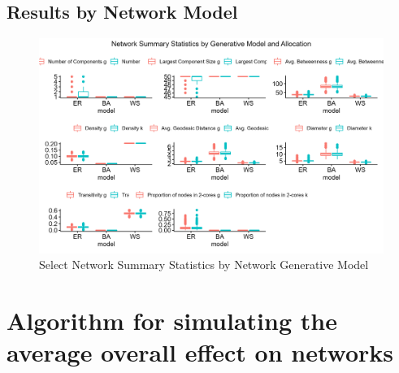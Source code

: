 \documentclass{article}
\theoremstyle{definition}
\begin{document}
\subsection{Results by Network Model}
\begin{figure}[H]
    \centering
    \includegraphics[width=\linewidth
    ]{Figures/Network Summary Statistics.png}
    \caption{Select Network Summary Statistics by Network Generative Model}
    \label{fig:Figure B1}
\end{figure}



\newpage
\section{Algorithm for simulating the average overall effect on networks}
\label{Appendix 3}
\end{document}
